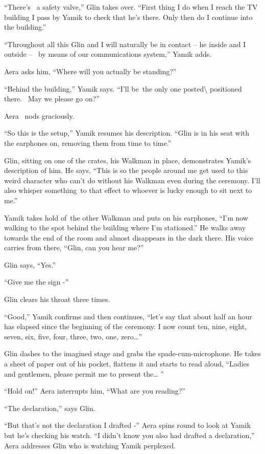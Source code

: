 \documentclass[twoside,11pt]{book}
\begin{document}
``There's ~a safety valve,'' Glin takes over. ``First thing I do when I reach the
TV building I pass by Yamik to check that he's there. Only then do I continue into the building.''

``Throughout all this Glin and I will naturally be in contact -- he inside and I outside -- \ by means of
our communications system,'' Yamik adds.

Aera asks him, ``Where will you actually be standing?''

``Behind the building,'' Yamik says. ``I'll be~the only one
posted{\textbackslash} positioned there.{ \ }May we please go
on?{\textbar}''

Aera \ nods graciously.

``So this is the setup,'' Yamik resumes his description. ``Glin is in his seat
with the earphones on, removing them from time to time.''

Glin, sitting on one of the crates, his Walkman in place, demonstrates Yamik's description of him. He says,
``This is so the{ }people around me get used to this weird
character who can't do without his Walkman even during the ceremony. I'll also whisper something~to that effect to
whoever is lucky enough to sit next to me.''

Yamik takes hold of~the other Walkman and puts on his earphones, ``I'm now walking to the spot behind the
building where I'm stationed.'' He walks away towards the end of the room and almost disappears in the
dark there. His voice carries from there, ``Glin, can you hear me?''

Glin says, ``Yes.''

``Give me the sign -''

Glin clears his throat three times.

``Good,'' Yamik confirms and then continues, ``let's say that about half an hour
has elapsed since the beginning of the ceremony. I now count ten, nine, eight, seven, six, five, four, three, two, one,
zero{\dots}''

Glin dashes to the imagined stage and grabs the{ }spade-cum-microphone. He takes a sheet of paper out of
his pocket, flattens it and starts to read aloud, ``Ladies and gentlemen, please permit me to present
the{\dots} ''

``Hold on!'' Aera interrupts him, ``What are you reading?''

``The declaration,'' says Glin.

``But that's not the declaration I drafted -'' Aera spins round to look at Yamik but he's
checking his watch. ``I didn't know you also had drafted a declaration,'' Aera addresses Glin
who is watching Yamik perplexed.
\end{document}
